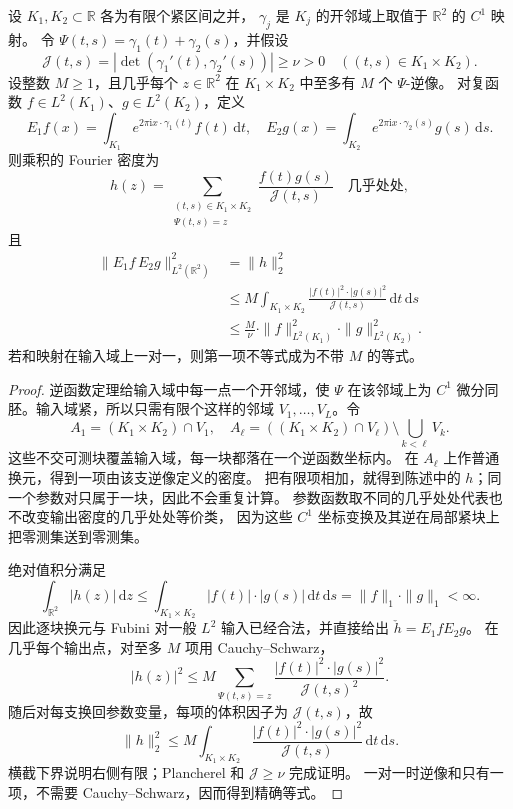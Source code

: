 \begin{proposition}[有限重数的曲线双线性估计]\label{b2:prop:25-finite-multiplicity}
设 \(K_1,K_2\subset\mathbb R\) 各为有限个紧区间之并，
\(\gamma_j\) 是 \(K_j\) 的开邻域上取值于 \(\mathbb R^2\) 的 \(C^1\) 映射。
令 \(\Psi(t,s)=\gamma_1(t)+\gamma_2(s)\)，并假设
\[
 \mathcal J(t,s)=|\det(\gamma_1'(t),\gamma_2'(s))|
 \geq\nu>0\quad((t,s)\in K_1\times K_2).
\]
设整数 \(M\geq1\)，且几乎每个 \(z\in\mathbb R^2\) 在
\(K_1\times K_2\) 中至多有 \(M\) 个 \(\Psi\)-逆像。
对复函数 \(f\in L^2(K_1)\)、\(g\in L^2(K_2)\)，定义
\[
 E_1f(x)=\int_{K_1}e^{2\pi\mathrm ix\cdot\gamma_1(t)}f(t)\,\mathrm dt,
 \quad
 E_2g(x)=\int_{K_2}e^{2\pi\mathrm ix\cdot\gamma_2(s)}g(s)\,\mathrm ds.
\]
则乘积的 Fourier 密度为
\[
 h(z)=\sum_{\substack{(t,s)\in K_1\times K_2\\\Psi(t,s)=z}}
 \frac{f(t)g(s)}{\mathcal J(t,s)}
 \quad\text{几乎处处},
\]
且
\[
 \begin{split}
 \|E_1f\,E_2g\|_{L^2(\mathbb R^2)}^2
 &=\|h\|_2^2\\
 &\leq M\int_{K_1\times K_2}
 \frac{|f(t)|^2\cdot|g(s)|^2}{\mathcal J(t,s)}
 \,\mathrm dt\,\mathrm ds\\
 &\leq\frac M\nu
 \cdot\|f\|_{L^2(K_1)}^2\cdot\|g\|_{L^2(K_2)}^2.
 \end{split}
\]
若和映射在输入域上一对一，则第一项不等式成为不带 \(M\) 的等式。
\end{proposition}
\begin{proof}
逆函数定理给输入域中每一点一个开邻域，使 \(\Psi\) 在该邻域上为
\(C^1\) 微分同胚。输入域紧，所以只需有限个这样的邻域
\(V_1,\ldots,V_L\)。令
\[
 A_1=(K_1\times K_2)\cap V_1,\quad
 A_\ell=((K_1\times K_2)\cap V_\ell)
 \setminus\bigcup_{k<\ell}V_k.
\]
这些不交可测块覆盖输入域，每一块都落在一个逆函数坐标内。
在 \(A_\ell\) 上作普通换元，得到一项由该支逆像定义的密度。
把有限项相加，就得到陈述中的 \(h\)；同一个参数对只属于一块，因此不会重复计算。
参数函数取不同的几乎处处代表也不改变输出密度的几乎处处等价类，
因为这些 \(C^1\) 坐标变换及其逆在局部紧块上把零测集送到零测集。

绝对值积分满足
\[
 \int_{\mathbb R^2}|h(z)|\,\mathrm dz
 \leq\int_{K_1\times K_2}|f(t)|\cdot|g(s)|\,\mathrm dt\,\mathrm ds
 =\|f\|_1\cdot\|g\|_1<\infty.
\]
因此逐块换元与 Fubini 对一般 \(L^2\) 输入已经合法，并直接给出
\(\check h=E_1fE_2g\)。
在几乎每个输出点，对至多 \(M\) 项用 Cauchy--Schwarz，
\[
 |h(z)|^2
 \leq M\sum_{\Psi(t,s)=z}
 \frac{|f(t)|^2\cdot|g(s)|^2}{\mathcal J(t,s)^2}.
\]
随后对每支换回参数变量，每项的体积因子为 \(\mathcal J(t,s)\)，故
\[
 \|h\|_2^2
 \leq M\int_{K_1\times K_2}
 \frac{|f(t)|^2\cdot|g(s)|^2}{\mathcal J(t,s)}
 \,\mathrm dt\,\mathrm ds.
\]
横截下界说明右侧有限；Plancherel 和 \(\mathcal J\geq\nu\) 完成证明。
一对一时逆像和只有一项，不需要 Cauchy--Schwarz，因而得到精确等式。
\end{proof}

